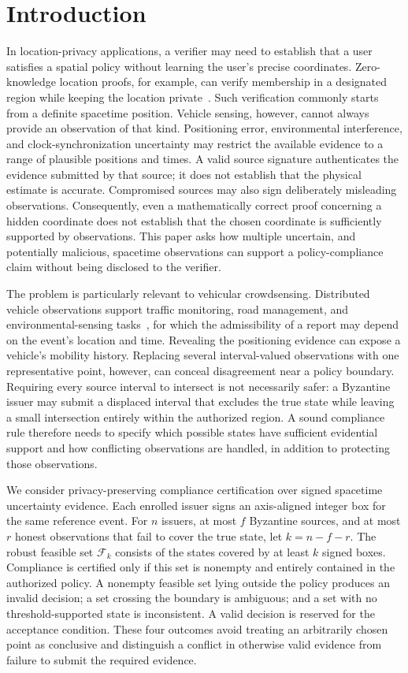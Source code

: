 \section{Introduction}
In location-privacy applications, a verifier may need to establish that a user satisfies a spatial policy without learning the user's precise coordinates. Zero-knowledge location proofs, for example, can verify membership in a designated region while keeping the location private~\cite{ZKLP,VehiclePolicy}. Such verification commonly starts from a definite spacetime position. Vehicle sensing, however, cannot always provide an observation of that kind. Positioning error, environmental interference, and clock-synchronization uncertainty may restrict the available evidence to a range of plausible positions and times. A valid source signature authenticates the evidence submitted by that source; it does not establish that the physical estimate is accurate. Compromised sources may also sign deliberately misleading observations. Consequently, even a mathematically correct proof concerning a hidden coordinate does not establish that the chosen coordinate is sufficiently supported by observations. This paper asks how multiple uncertain, and potentially malicious, spacetime observations can support a policy-compliance claim without being disclosed to the verifier.

The problem is particularly relevant to vehicular crowdsensing. Distributed vehicle observations support traffic monitoring, road management, and environmental-sensing tasks~\cite{Suhag2023,Zheng2025BARM}, for which the admissibility of a report may depend on the event's location and time. Revealing the positioning evidence can expose a vehicle's mobility history. Replacing several interval-valued observations with one representative point, however, can conceal disagreement near a policy boundary. Requiring every source interval to intersect is not necessarily safer: a Byzantine issuer may submit a displaced interval that excludes the true state while leaving a small intersection entirely within the authorized region. A sound compliance rule therefore needs to specify which possible states have sufficient evidential support and how conflicting observations are handled, in addition to protecting those observations.

We consider privacy-preserving compliance certification over signed spacetime uncertainty evidence. Each enrolled issuer signs an axis-aligned integer box for the same reference event. For $n$ issuers, at most $f$ Byzantine sources, and at most $r$ honest observations that fail to cover the true state, let $k=n-f-r$. The robust feasible set $\mathcal F_k$ consists of the states covered by at least $k$ signed boxes. Compliance is certified only if this set is nonempty and entirely contained in the authorized policy. A nonempty feasible set lying outside the policy produces an invalid decision; a set crossing the boundary is ambiguous; and a set with no threshold-supported state is inconsistent. A valid decision is reserved for the acceptance condition. These four outcomes avoid treating an arbitrarily chosen point as conclusive and distinguish a conflict in otherwise valid evidence from failure to submit the required evidence.

